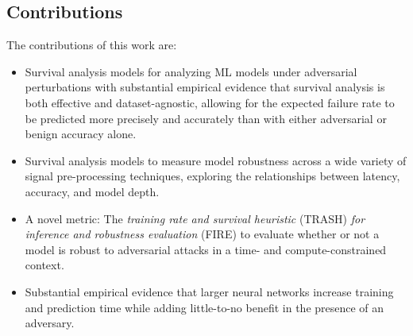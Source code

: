 \subsection{Contributions}

The contributions of this work are:
\begin{itemize}
	\item Survival analysis models for analyzing ML models under adversarial perturbations with substantial empirical evidence that survival analysis is both effective and dataset-agnostic, allowing for the expected failure rate to be predicted more precisely and accurately than with either adversarial or benign accuracy alone.
	\item Survival analysis models to measure model robustness across a wide variety of signal pre-processing techniques, exploring the relationships between latency, accuracy, and model depth.
	\item A novel metric: The \textit{training rate and survival heuristic } (TRASH) \textit{for inference and robustness evaluation} (FIRE) to evaluate whether or not a model is robust to adversarial attacks in a time- and compute-constrained context.
	\item Substantial empirical evidence that larger neural networks increase training and prediction time while adding little-to-no benefit in the presence of an adversary.
\end{itemize}
